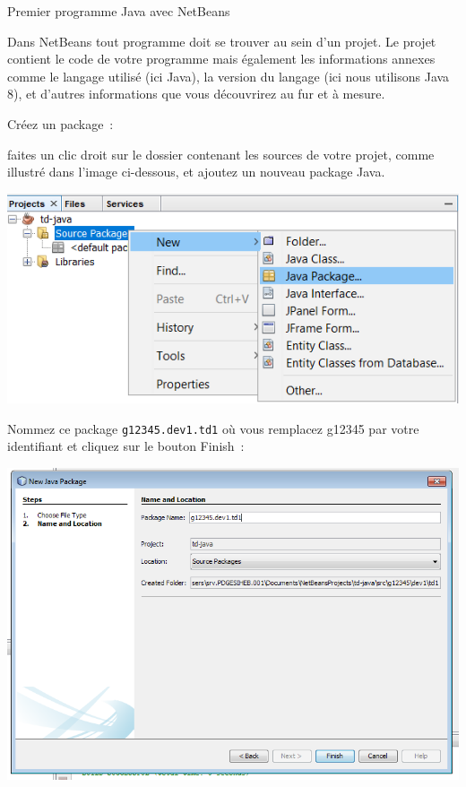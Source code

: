 \documentclass[a4paper,11pt]{article}
\begin{document}
\begin{Tutoriel}{Premier programme Java avec NetBeans}
\begin{steps}
			Dans NetBeans tout programme doit se trouver au sein d'un projet.
			Le projet contient le code de votre programme mais également les 
			informations annexes comme le langage utilisé (ici Java), 
			la version du langage (ici nous utilisons Java 8), 
			et d'autres informations que vous découvrirez au fur et à mesure.



		\item Créez un package~: 
		
			faites un clic droit sur le dossier contenant les sources de votre projet, 
			comme illustré dans l'image ci-dessous, et ajoutez un nouveau package Java.
		
			\bigskip
			\begin{center}
				\includegraphics[width=.9\textwidth]{images/nb_newproject_package}
			\end{center}

			Nommez ce package \texttt{g12345.dev1.td1} où vous remplacez g12345 par votre identifiant et cliquez sur le bouton \og Finish\fg~:
			
			\bigskip
			\begin{center}
				\includegraphics[width=.9\textwidth]{images/nb_newproject_package2}
			\end{center}
			

\end{steps}
\end{Tutoriel}
\end{document}
